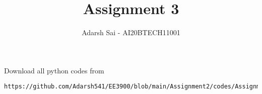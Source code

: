 \documentclass[journal,12pt,twocolumn]{IEEEtran}
\DeclareMathOperator*{\Res}{Res}
\begin{document}
\newcommand{\BEQA}{\begin{eqnarray}}
\newcommand{\EEQA}{\end{eqnarray}}
\newcommand{\define}{\stackrel{\triangle}{=}}

\raggedbottom
\setlength{\parindent}{0pt}
\providecommand{\mbf}{\mathbf}
\providecommand{\pr}[1]{\ensuremath{\Pr\left(#1\right)}}
\providecommand{\qfunc}[1]{\ensuremath{Q\left(#1\right)}}
\providecommand{\sbrak}[1]{\ensuremath{{}\left[#1\right]}}
\providecommand{\lsbrak}[1]{\ensuremath{{}\left[#1\right.}}
\providecommand{\rsbrak}[1]{\ensuremath{{}\left.#1\right]}}
\providecommand{\brak}[1]{\ensuremath{\left(#1\right)}}
\providecommand{\lbrak}[1]{\ensuremath{\left(#1\right.}}
\providecommand{\rbrak}[1]{\ensuremath{\left.#1\right)}}
\providecommand{\cbrak}[1]{\ensuremath{\left\{#1\right\}}}
\providecommand{\lcbrak}[1]{\ensuremath{\left\{#1\right.}}
\providecommand{\rcbrak}[1]{\ensuremath{\left.#1\right\}}}
\theoremstyle{remark}
\newtheorem{rem}{Remark}
\newcommand{\sgn}{\mathop{\mathrm{sgn}}}
\providecommand{\abs}[1]{\vert#1\vert}
\providecommand{\res}[1]{\Res\displaylimits_{#1}} 
\providecommand{\norm}[1]{\lVert#1\rVert}
\providecommand{\mtx}[1]{\mathbf{#1}}
\providecommand{\mean}[1]{E[ #1 ]}
\providecommand{\fourier}{\overset{\mathcal{F}}{ \rightleftharpoons}}
\providecommand{\system}{\overset{\mathcal{H}}{ \longleftrightarrow}}
\newcommand{\solution}{\noindent \textbf{Solution: }}
\newcommand{\cosec}{\,\text{cosec}\,}
\providecommand{\dec}[2]{\ensuremath{\overset{#1}{\underset{#2}{\gtrless}}}}
\newcommand{\myvec}[1]{\ensuremath{\begin{pmatrix}#1\end{pmatrix}}}
\newcommand{\mydet}[1]{\ensuremath{\begin{vmatrix}#1\end{vmatrix}}}
\makeatletter
{}
\makeatother
\let\StandardTheFigure\thefigure
\let\vec\mathbf
\renewcommand{\thefigure}{\theproblem}
\def\putbox#1#2#3{\makebox[0in][l]{\makebox[#1][l]{}\raisebox{\baselineskip}[0in][0in]{\raisebox{#2}[0in][0in]{#3}}}}
     \def\rightbox#1{\makebox[0in][r]{#1}}
     \def\centbox#1{\makebox[0in]{#1}}
     \def\topbox#1{\raisebox{-\baselineskip}[0in][0in]{#1}}
     \def\midbox#1{\raisebox{-0.5\baselineskip}[0in][0in]{#1}}
\vspace{3cm}
\title{Assignment 3}
\author{Adarsh Sai - AI20BTECH11001}
\maketitle
\newpage
\bigskip
\renewcommand{\thefigure}{\theenumi}
\renewcommand{\thetable}{\theenumi}
Download all python codes from 
\begin{lstlisting}
https://github.com/Adarsh541/EE3900/blob/main/Assignment2/codes/Assignment3.py
\end{lstlisting}
\end{document}
